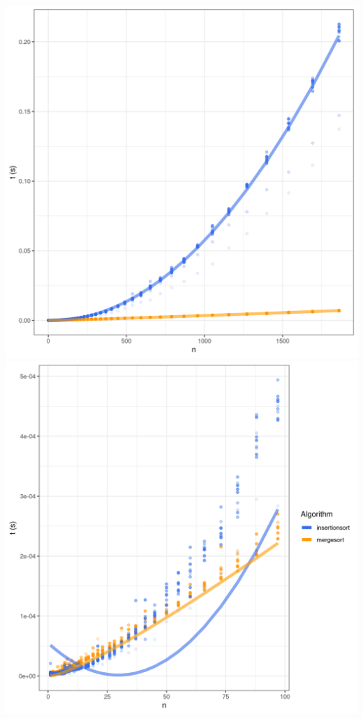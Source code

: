 



\centering
\includegraphics[scale=1]{../img/toAlgoritmer(BIG).png}
\newpage
\centering
\includegraphics[scale=1]{../img/toAlgoritmerZoomed(BIG).png}
